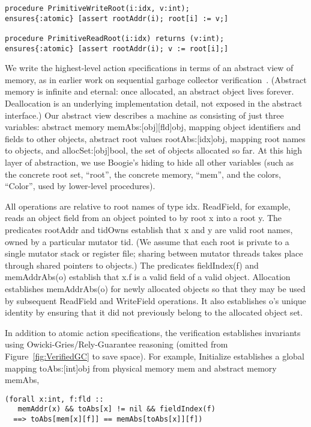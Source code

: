 \begin{verbatim}
procedure PrimitiveWriteRoot(i:idx, v:int);
ensures{:atomic} [assert rootAddr(i); root[i] := v;]

procedure PrimitiveReadRoot(i:idx) returns (v:int);
ensures{:atomic} [assert rootAddr(i); v := root[i];]
\end{verbatim}

We write the highest-level action specifications in terms of an abstract view of memory,
as in earlier work on sequential garbage collector verification~\cite{mccr07,hawb09}.
(Abstract memory is infinite and eternal: once allocated, an abstract object lives forever.
Deallocation is an underlying implementation detail, not exposed in the abstract interface.)
Our abstract view describes a machine as consisting of just three variables:
abstract memory memAbs:[obj][fld]obj, mapping object identifiers and fields to other objects,
abstract root values rootAbs:[idx]obj, mapping root names to objects, and
allocSet:[obj]bool, the set of objects allocated so far.
At this high layer of abstraction, we use Boogie's hiding to hide all other variables
(such as the concrete root set, ``root'', the concrete memory, ``mem'', and the colors, ``Color'', used by lower-level procedures).

All operations are relative to root names of type idx.
ReadField, for example, reads an object field from an object pointed to by root x into a root y.
The predicates rootAddr and tidOwns establish that x and y are valid root names, owned by a particular mutator tid.
(We assume that each root is private to a single mutator stack or register file;
sharing between mutator threads takes place through shared pointers to objects.)
The predicates fieldIndex(f) and memAddrAbs(o) establish that x.f is a valid field of a valid object.
Allocation establishes memAddrAbs(o) for newly allocated objects so that they may be used by subsequent ReadField and WriteField operations.
It also establishes o's unique identity by ensuring that it did not previously belong to the allocated object set.

In addition to atomic action specifications, the verification establishes invariants using Owicki-Gries/Rely-Guarantee reasoning
(omitted from Figure~\ref{fig:VerifiedGC} to save space).
For example, Initialize establishes a global mapping toAbs:[int]obj from physical memory mem and abstract memory memAbs,

\begin{verbatim}
(forall x:int, f:fld ::
   memAddr(x) && toAbs[x] != nil && fieldIndex(f)
  ==> toAbs[mem[x][f]] == memAbs[toAbs[x]][f])
\end{verbatim}

